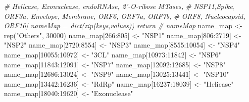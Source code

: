 \documentclass{article}
\newenvironment{Shaded}{\begin{snugshade}}{\end{snugshade}}
\newcommand{\CommentTok}[1]{\textcolor[rgb]{0.56,0.35,0.01}{\textit{#1}}}
\newcommand{\DecValTok}[1]{\textcolor[rgb]{0.00,0.00,0.81}{#1}}
\newcommand{\FunctionTok}[1]{\textcolor[rgb]{0.00,0.00,0.00}{#1}}
\newcommand{\NormalTok}[1]{#1}
\newcommand{\OtherTok}[1]{\textcolor[rgb]{0.56,0.35,0.01}{#1}}
\newcommand{\SpecialCharTok}[1]{\textcolor[rgb]{0.00,0.00,0.00}{#1}}
\newcommand{\StringTok}[1]{\textcolor[rgb]{0.31,0.60,0.02}{#1}}
\begin{document}
\begin{Shaded}
\begin{Highlighting}[]
\CommentTok{\# \textquotesingle{}Helicase\textquotesingle{}, \textquotesingle{}Exonuclease\textquotesingle{}, \textquotesingle{}endoRNAse\textquotesingle{}, \textquotesingle{}2’{-}O{-}ribose MTases\textquotesingle{},}
\CommentTok{\# \textquotesingle{}NSP11\textquotesingle{},\textquotesingle{}Spike\textquotesingle{}, \textquotesingle{}ORF3a\textquotesingle{}, \textquotesingle{}Envelope\textquotesingle{}, \textquotesingle{}Membrane\textquotesingle{}, \textquotesingle{}ORF6\textquotesingle{}, \textquotesingle{}ORF7a\textquotesingle{}, \textquotesingle{}ORF7b\textquotesingle{},}
\CommentTok{\# \textquotesingle{}ORF8\textquotesingle{}, \textquotesingle{}Nucleocapsid\textquotesingle{}, \textquotesingle{}ORF10\textquotesingle{}] nameMap = dict(zip(keys,values)) return}
\CommentTok{\# nameMap}
\NormalTok{name\_map }\OtherTok{\textless{}{-}} \FunctionTok{rep}\NormalTok{(}\StringTok{"Others"}\NormalTok{, }\DecValTok{30000}\NormalTok{)}
\NormalTok{name\_map[}\DecValTok{266}\SpecialCharTok{:}\DecValTok{805}\NormalTok{] }\OtherTok{\textless{}{-}} \StringTok{"NSP1"}
\NormalTok{name\_map[}\DecValTok{806}\SpecialCharTok{:}\DecValTok{2719}\NormalTok{] }\OtherTok{\textless{}{-}} \StringTok{"NSP2"}
\NormalTok{name\_map[}\DecValTok{2720}\SpecialCharTok{:}\DecValTok{8554}\NormalTok{] }\OtherTok{\textless{}{-}} \StringTok{"NSP3"}
\NormalTok{name\_map[}\DecValTok{8555}\SpecialCharTok{:}\DecValTok{10054}\NormalTok{] }\OtherTok{\textless{}{-}} \StringTok{"NSP4"}
\NormalTok{name\_map[}\DecValTok{10055}\SpecialCharTok{:}\DecValTok{10972}\NormalTok{] }\OtherTok{\textless{}{-}} \StringTok{"3CL"}
\NormalTok{name\_map[}\DecValTok{10973}\SpecialCharTok{:}\DecValTok{11842}\NormalTok{] }\OtherTok{\textless{}{-}} \StringTok{"NSP6"}
\NormalTok{name\_map[}\DecValTok{11843}\SpecialCharTok{:}\DecValTok{12091}\NormalTok{] }\OtherTok{\textless{}{-}} \StringTok{"NSP7"}
\NormalTok{name\_map[}\DecValTok{12092}\SpecialCharTok{:}\DecValTok{12685}\NormalTok{] }\OtherTok{\textless{}{-}} \StringTok{"NSP8"}
\NormalTok{name\_map[}\DecValTok{12686}\SpecialCharTok{:}\DecValTok{13024}\NormalTok{] }\OtherTok{\textless{}{-}} \StringTok{"NSP9"}
\NormalTok{name\_map[}\DecValTok{13025}\SpecialCharTok{:}\DecValTok{13441}\NormalTok{] }\OtherTok{\textless{}{-}} \StringTok{"NSP10"}
\NormalTok{name\_map[}\DecValTok{13442}\SpecialCharTok{:}\DecValTok{16236}\NormalTok{] }\OtherTok{\textless{}{-}} \StringTok{"RdRp"}
\NormalTok{name\_map[}\DecValTok{16237}\SpecialCharTok{:}\DecValTok{18039}\NormalTok{] }\OtherTok{\textless{}{-}} \StringTok{"Helicase"}
\NormalTok{name\_map[}\DecValTok{18040}\SpecialCharTok{:}\DecValTok{19620}\NormalTok{] }\OtherTok{\textless{}{-}} \StringTok{"Exonuclease"}

\end{Highlighting}
\end{Shaded}
\end{document}
